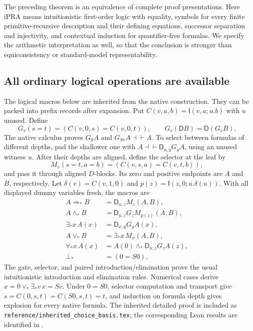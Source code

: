 \documentclass[11pt]{article}
\theoremstyle{definition}\newtheorem{definition}[theorem]{Definition}
\theoremstyle{remark}\newtheorem{remark}[theorem]{Remark}
\newcommand{\I}{\mathsf I}
\newcommand{\D}{\mathsf D}
\newcommand{\code}[1]{\texttt{#1}}
\begin{document}
The preceding theorem is an equivalence of complete proof presentations.
Here iPRA means intuitionistic first-order logic with equality, symbols
for every finite primitive-recursive description and their defining
equations, successor separation and injectivity, and contextual induction
for quantifier-free formulas. We specify the arithmetic interpretation as well, so that the conclusion
is stronger than equiconsistency or standard-model representability.

\subsection{All ordinary logical operations are available}

The logical macros below are inherited from the native construction.
They can be packed into prefix records after expansion. Put
$C(v,a,b)=\I(v,a;u.b)$ with $u$ unused. Define
\[
 G_v(s=t)=(C(v,0,s)=C(v,0,t)),\qquad G_v(\D B)=\D(G_v B).
\]
The native calculus proves $G_0 A$ and
$G_{Sv}A\dashv\vdash A$. To select between formulas of different
depths, pad the shallower one with
$A\dashv\vdash\D_{u,y}G_yA$, using an unused witness $u$.
After their depths are aligned, define the selector at the leaf by
\[
 M_v(s=t,a=b)=(C(v,s,a)=C(v,t,b)),
\]
and pass it through aligned $D$-blocks. Its zero and positive endpoints
are $A$ and $B$, respectively. Let
$\delta(v)=C(v,1,0)$ and $p(z)=\I(z,0;u.\delta(u))$.
With all displayed dummy variables fresh, the macros are
\[
\begin{aligned}
 A\Rightarrow_* B&=\D_{u,z}M_z(A,B),\\
 A\wedge_*B&=\D_{u,z}G_zM_{p(z)}(A,B),\\
 \exists_*x\,A(x)&=\D_{x,y}G_yA(x),\\
 A\vee_*B&=\exists_*x\,M_x(A,B),\\
 \forall_*x\,A(x)&=A(0)\wedge_*\D_{u,z}G_zA(z),\\
 \bot_*&=(0=S0).
\end{aligned}
\tag{7}\label{eq:macros}
\]
The gate, selector, and paired introduction/elimination prove the usual
intuitionistic introduction and elimination rules. Numerical cases derive
$x=0\vee_*\exists_*v\,x=Sv$. Under $0=S0$, selector computation and
transport give $s=C(0,s,t)=C(S0,s,t)=t$, and induction on formula depth
gives explosion for every native formula. The inherited detailed proof is
included as \code{reference/inherited\_choice\_basis.tex}; the corresponding
Lean results are identified in \cite{repo,native-bi}.
\end{document}
